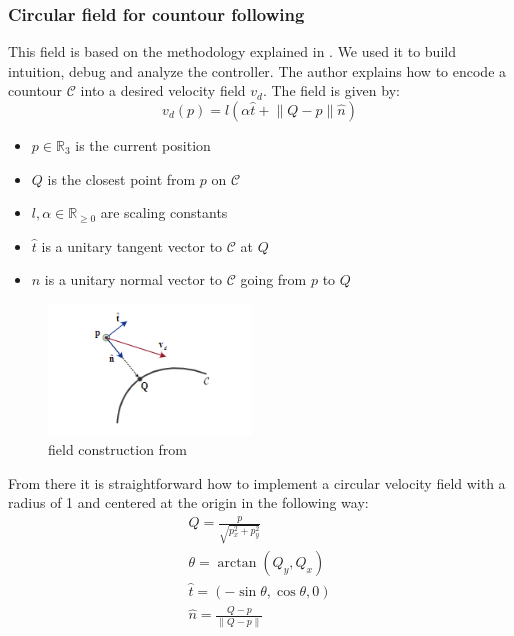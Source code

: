 \subsubsection{Circular field for countour following}
This field is based on the methodology explained in \cite{asl2019assistive}. We used it to build intuition, debug and analyze the controller.
The author explains how to encode a countour $\mathcal{C}$ into a desired velocity field $v_d$.
The field is given by: 
\begin{equation}
    v_d(p) = l(\alpha \hat{t} + \lVert Q-p \rVert \hat{n}) \label{eqn:circularfieldcons}
\end{equation}
\begin{itemize}
    \item $p\in \mathbb{R}_3$ is the current position
    \item $Q$ is the closest point from $p$ on $\mathcal{C}$
    \item $l , \alpha \in \mathbb{R}_{\geq 0}$ are scaling constants
    \item $\hat{t}$ is a unitary tangent vector to $\mathcal{C}$ at $Q$
    \item $\hat{n}$ is a unitary normal vector to $\mathcal{C}$ going from $p$ to $Q$
\end{itemize}

\begin{figure}[h!]
    \centering
    \includegraphics[width=0.48\textwidth]{Images/fieldconstruction.png}
    \caption{field construction from \cite{asl2019assistive}}
    \label{fig:fieldconstruction}
\end{figure} 

From there it is straightforward how to implement a circular velocity field with a radius of 1 and centered at the origin in the following way:
\begin{align}
    Q = \frac{p}{\sqrt{p_x^2 + p_y^2}}\\
    \theta = \arctan(Q_y, Q_x) \\
    \hat{t} = (-\sin{\theta}, \cos{\theta}, 0) \\
    \hat{n} = \frac{Q-p}{\lVert Q-p \rVert}
\end{align}
